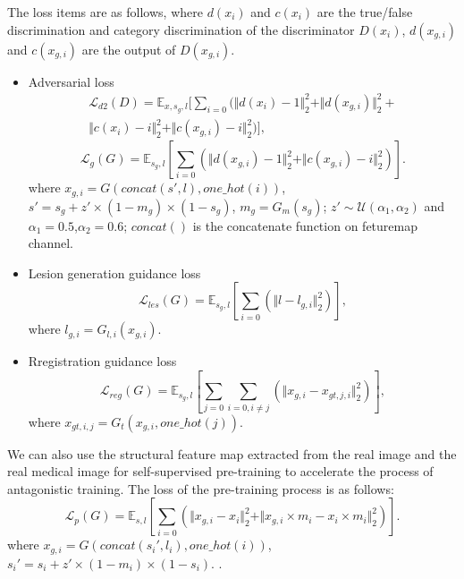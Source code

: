 \documentclass[runningheads]{llncs}
\begin{document}
	The loss items are as follows, where $d(x_{i})$ and $c(x_{i})$ are the true/false discrimination and category discrimination of the discriminator $D(x_i)$, $d(x_{g, i})$ and $c(x_{g,i})$ are the output of $D(x_{g,i})$. 
	\begin{itemize}
		\item{Adversarial loss}
		\begin{equation}
		\begin{split}
		\mathcal{L}_{d2}(D)=\mathbb{E}_{x,s_g,l}[\sum\limits_{i=0}(\Vert{d(x_i)-1}\Vert_{2}^{2}+\Vert{d(x_{g,i})}\Vert_{2}^{2}+\\
		\Vert{c(x_i)-i}\Vert_{2}^{2}+\Vert{c(x_{g,i})-i}\Vert_{2}^{2})],
		\end{split}
		\end{equation}
		\begin{equation}
		\mathcal{L}_{g}(G)=\mathbb{E}_{s_g,l}[\sum\limits_{i=0}(\Vert{d(x_{g,i})-1}\Vert_{2}^{2}+\Vert{c(x_{g,i})-i}\Vert_{2}^{2})].
		\end{equation}
		where $x_{g,i}=G(concat(s',l),one\_hot(i))$,
		$s'=s_g+z'\times(1-m_g)\times(1-s_g)$,
		$m_g=G_m(s_g)$;
		$z'\sim\mathcal{U}(\alpha_1,\alpha_2)$ and $\alpha_1=0.5$,$\alpha_2=0.6$;
		$concat()$ is the concatenate function on feturemap channel.
		\item{Lesion generation guidance loss}
		\begin{equation}
		\mathcal{L}_{les}(G)=\mathbb{E}_{s_g,l}[\sum\limits_{i=0}(\Vert{l-l_{g,i}}\Vert_{2}^{2})],
		\end{equation}
		where $l_{g,i}=G_{l,i}(x_{g,i})$.
		\item{Rregistration guidance loss}
		\begin{equation}
		\mathcal{L}_{reg}(G)=\mathbb{E}_{s_g,l}[\sum\limits_{j=0}\sum\limits_{i=0,i\neq j}(\Vert{x_{g,i}-x_{gt,j,i}}\Vert_{2}^{2})],
		\end{equation}
		where $x_{gt,i,j}=G_{t}(x_{g,i},one\_hot(j))$.
	\end{itemize}
	
	We can also use the structural feature map extracted from the real image and the real medical image for self-supervised pre-training to accelerate the process of antagonistic training. The loss of the pre-training process is as follows:
	\begin{equation}
	\mathcal{L}_{p}(G)=\mathbb{E}_{s,l}[\sum\limits_{i=0}(\Vert{x_{g,i}-x_i}\Vert_{2}^{2}+\Vert{x_{g,i}\times m_i-x_{i}\times m_i}\Vert_{2}^{2})].
	\end{equation}
	where $x_{g,i}=G(concat(s_i',l_i),one\_hot(i))$,$s_i'=s_i+z'\times(1-m_i)\times(1-s_i)$.
	.
	
\end{document}
